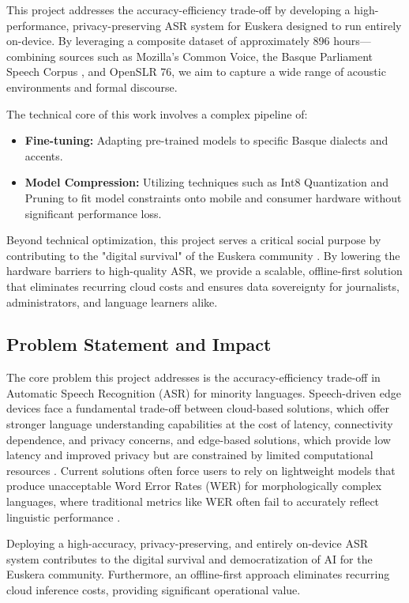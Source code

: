 \documentclass[12pt]{article}
\begin{document}
This project addresses the accuracy-efficiency trade-off by developing a high-performance, privacy-preserving ASR system for Euskera designed to run entirely on-device. By leveraging a composite dataset of approximately 896 hours—combining sources such as Mozilla’s Common Voice, the Basque Parliament Speech Corpus \cite{mdpi2024basque}, and OpenSLR 76, we aim to capture a wide range of acoustic environments and formal discourse.

The technical core of this work involves a complex pipeline of:
\begin{itemize}
    \item \textbf{Fine-tuning:} Adapting pre-trained models to specific Basque dialects and accents.
    \item \textbf{Model Compression:} Utilizing techniques such as Int8 Quantization and Pruning to fit model constraints onto mobile and consumer hardware without significant performance loss.
\end{itemize}

Beyond technical optimization, this project serves a critical social purpose by contributing to the "digital survival" of the Euskera community \cite{hernaez2022ele}. By lowering the hardware barriers to high-quality ASR, we provide a scalable, offline-first solution that eliminates recurring cloud costs and ensures data sovereignty for journalists, administrators, and language learners alike.

\subsection{Problem Statement and Impact}
The core problem this project addresses is the accuracy-efficiency trade-off in Automatic Speech Recognition (ASR) for minority languages. Speech-driven edge devices face a fundamental trade-off between cloud-based solutions, which offer stronger language understanding capabilities at the cost of latency, connectivity dependence, and privacy concerns, and edge-based solutions, which provide low latency and improved privacy but are constrained by limited computational resources \cite{asta2025}. Current solutions often force users to rely on lightweight models that produce unacceptable Word Error Rates (WER) for morphologically complex languages, where traditional metrics like WER often fail to accurately reflect linguistic performance \cite{cer2025}. 

Deploying a high-accuracy, privacy-preserving, and entirely on-device ASR system contributes to the digital survival and democratization of AI for the Euskera community. Furthermore, an offline-first approach eliminates recurring cloud inference costs, providing significant operational value.
\end{document}
